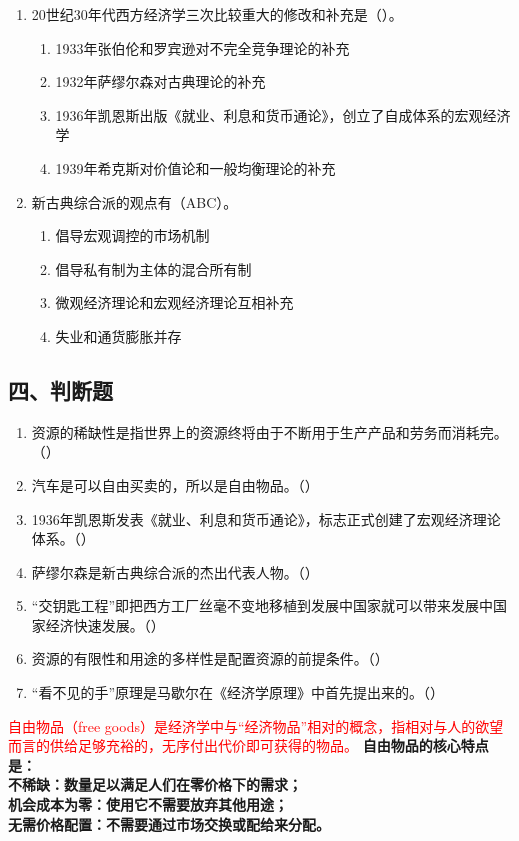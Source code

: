 \documentclass{article}
\begin{document}
\begin{enumerate}[label={\arabic*.}]
    \item 20世纪30年代西方经济学三次比较重大的修改和补充是（\quad）。
    \begin{enumerate}[label={\Alph*.},topsep=0pt,itemsep=0pt]
        \item 1933年张伯伦和罗宾逊对不完全竞争理论的补充
        \item 1932年萨缪尔森对古典理论的补充
        \item 1936年凯恩斯出版《就业、利息和货币通论》，创立了自成体系的宏观经济学
        \item 1939年希克斯对价值论和一般均衡理论的补充
    \end{enumerate}

    \item 新古典综合派的观点有（ABC）。
    \begin{enumerate}[label={\Alph*.},topsep=0pt,itemsep=0pt]
        \item 倡导宏观调控的市场机制
        \item 倡导私有制为主体的混合所有制
        \item 微观经济理论和宏观经济理论互相补充
        \item 失业和通货膨胀并存
    \end{enumerate}
\end{enumerate}

\subsection*{四、判断题}
    \begin{enumerate}[label={\arabic*.}]
        \item 资源的稀缺性是指世界上的资源终将由于不断用于生产产品和劳务而消耗完。（\quad）
        \item 汽车是可以自由买卖的，所以是自由物品。（\quad）
        \item 1936年凯恩斯发表《就业、利息和货币通论》，标志正式创建了宏观经济理论体系。（\quad）
        \item 萨缪尔森是新古典综合派的杰出代表人物。（\quad）
        \item “交钥匙工程”即把西方工厂丝毫不变地移植到发展中国家就可以带来发展中国家经济快速发展。（\quad）
        \item 资源的有限性和用途的多样性是配置资源的前提条件。（\quad）
        \item “看不见的手”原理是马歇尔在《经济学原理》中首先提出来的。（\quad）
    \end{enumerate}


    \textcolor{red}{自由物品（free goods）是经济学中与“经济物品”相对的概念，指相对与人的欲望而言的供给足够充裕的，无序付出代价即可获得的物品。}
    \textbf {自由物品的核心特点是：\\}
    \textbf{不稀缺：数量足以满足人们在零价格下的需求；\\}
    \textbf{机会成本为零：使用它不需要放弃其他用途；\\}
    \textbf{无需价格配置：不需要通过市场交换或配给来分配。\\}
\end{document}
